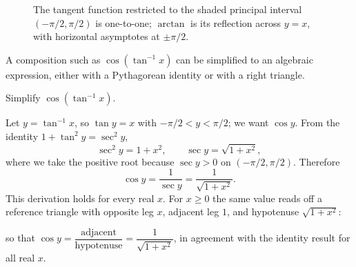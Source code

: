 \begin{figure}[H]
\centering
{}
\caption{The tangent function restricted to the shaded principal interval \((-\pi/2, \pi/2)\) is one-to-one; \(\arctan\) is its reflection across \(y = x\), with horizontal asymptotes at \(\pm \pi/2\).}
\label{fig:inverse-tangent}
\end{figure}

A composition such as \(\cos(\tan^{-1} x)\) can be simplified to an algebraic expression, either with a Pythagorean identity or with a right triangle.

\begin{workedexample}
\begin{example}\label{ex:cos-arctan}
Simplify \(\cos(\tan^{-1} x)\).
\end{example}

\begin{solution}
Let \(y = \tan^{-1} x\), so \(\tan y = x\) with \(-\pi/2 < y < \pi/2\); we want \(\cos y\). From the identity \(1 + \tan^{2} y = \sec^{2} y\),
\[
\sec^{2} y = 1 + x^{2}, \qquad \sec y = \sqrt{1 + x^{2}},
\]
where we take the positive root because \(\sec y > 0\) on \((-\pi/2, \pi/2)\). Therefore
\[
\cos y = \frac{1}{\sec y} = \frac{1}{\sqrt{1 + x^{2}}}.
\]
This derivation holds for every real \(x\). For \(x \ge 0\) the same value reads off a reference triangle with opposite leg \(x\), adjacent leg \(1\), and hypotenuse \(\sqrt{1 + x^{2}}\):
\begin{center}
\end{center}
so that \(\cos y = \dfrac{\text{adjacent}}{\text{hypotenuse}} = \dfrac{1}{\sqrt{1 + x^{2}}}\), in agreement with the identity result for all real \(x\).
\end{solution}
\end{workedexample}

